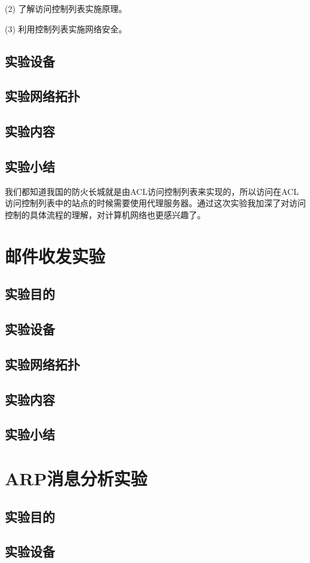 \documentclass[lang=cn,11pt,a4paper,cite=authoryear]{elegantpaper}
\begin{document}
(2)	了解访问控制列表实施原理。

(3)	利用控制列表实施网络安全。

\subsection{实验设备}
\subsection{实验网络拓扑}
\subsection{实验内容}
\subsection{实验小结}

我们都知道我国的防火长城就是由ACL访问控制列表来实现的，所以访问在ACL访问控制列表中的站点的时候需要使用代理服务器。通过这次实验我加深了对访问控制的具体流程的理解，对计算机网络也更感兴趣了。
\section{邮件收发实验}
\subsection{实验目的}
\subsection{实验设备}
\subsection{实验网络拓扑}
\subsection{实验内容}
\subsection{实验小结}
\section{ARP消息分析实验}
\subsection{实验目的}
\subsection{实验设备}
\end{document}
